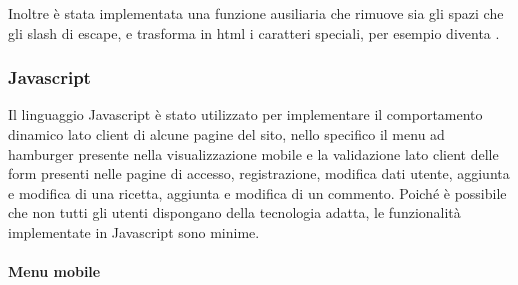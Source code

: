 Inoltre è stata implementata una funzione ausiliaria  che rimuove sia gli spazi che gli slash di escape, e trasforma in html i caratteri speciali, per esempio  diventa .

\subsubsection{Javascript}\label{subs:javascript}
Il linguaggio Javascript è stato utilizzato per implementare il comportamento dinamico lato client di alcune pagine del sito, nello specifico il menu ad hamburger presente nella visualizzazione mobile e la validazione lato client delle form presenti nelle pagine di accesso, registrazione, modifica dati utente, aggiunta e modifica di una ricetta, aggiunta e modifica di un commento.
Poiché è possibile che non tutti gli utenti dispongano della tecnologia adatta, le funzionalità implementate in Javascript sono minime.
\paragraph{Menu mobile}\label{par:menu_mobile}

